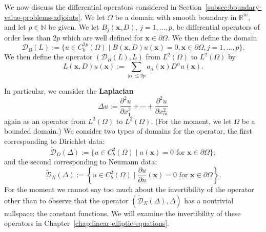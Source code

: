 \begin{Example}
\label{ex:differential-operator-boundary-domains}
We now discuss the differential operators considered in Section~\ref{subsec:boundary-value-problems-adjoints}. We let $\Omega$ be a domain with smooth boundary in $\mathbb{R}^m$, and let $p\in\mathbb{N}$ be given. We let $B_j(\bm{x},D)$, $j=1,\ldots,p$, be differential operators of order less than $2p$ which are well defined for $\bm{x}\in\partial\Omega$. We then define the domain
\begin{equation}\label{eq:differential-operator-boundary-domain}
\mathcal{D}_B(L):=\{u\in C_b^{2p}(\Omega)\mid B(\bm{x},D)u(\bm{x})=0,\bm{x}\in\partial\Omega,j=1,\ldots,p\}.
\end{equation}
We then define the operator $(\mathcal{D}_B(L),L)$ from $L^2(\Omega)$ to $L^2(\Omega)$ by
\begin{equation}\label{eq:general-differential-operator-action}
L(\bm{x},D)u(\bm{x}):=\sum_{|\alpha|\leq 2p}a_\alpha(\bm{x})D^\alpha u(\bm{x}).
\end{equation}

\end{Example}

\begin{Example}
\label{ex:laplacian-dirichlet-neumann-domains}
In particular, we consider the \textbf{Laplacian}\[\Delta u:=\dfrac{\partial^2u}{\partial x_1^2}+\cdots+\dfrac{\partial^2u}{\partial x_m^2}\]again as an operator from $L^2(\Omega)$ to $L^2(\Omega)$. (For the moment, we let $\Omega$ be a bounded domain.) We consider two types of domains for the operator, the first corresponding to Dirichlet data:
\begin{equation}\label{eq:laplacian-classical-dirichlet-domain}
\widetilde{\mathcal{D}}_D(\Delta):=\{u\in C_b^2(\Omega)\mid u(\bm{x})=0\text{ for }\bm{x}\in\partial\Omega\};
\end{equation}
and the second corresponding to Neumann data:
\begin{equation}\label{eq:laplacian-classical-neumann-domain}
\widetilde{\mathcal{D}}_N(\Delta):=\left\{u\in C_b^2(\Omega)\mid\dfrac{\partial u}{\partial n}(\bm{x})=0\text{ for }\bm{x}\in\partial\Omega\right\}.
\end{equation}
For the moment we cannot say too much about the invertibility of the operator other than to observe that the operator $(\widetilde{\mathcal{D}}_N(\Delta),\Delta)$ has a nontrivial nullspace: the constant functions. We will examine the invertibility of these operators in Chapter~\ref{chap:linear-elliptic-equations}.
\end{Example}
